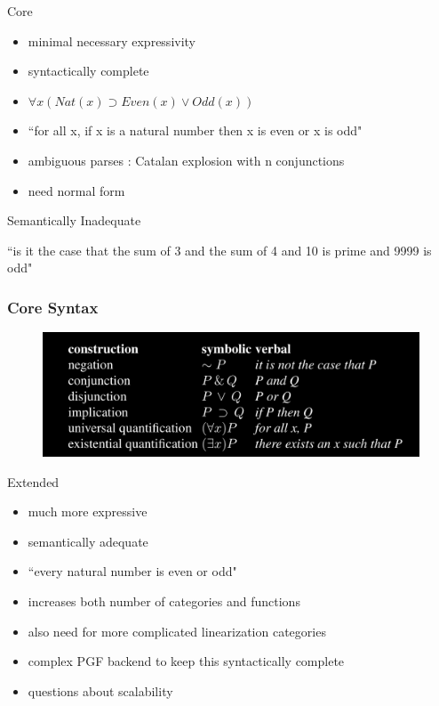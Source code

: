 \documentclass[10pt]{beamer}
\begin{document}
\begin{frame}

\begin{block}{Core}
\begin{itemize}
\item minimal necessary expressivity
\item syntactically complete
\item $\forall x (Nat(x) \supset Even(x) \lor Odd(x))$
\item ``for all x, if x is a natural number then x is even or x is odd"
\item ambiguous parses : Catalan explosion with n conjunctions
\item need normal form
\end{itemize}
\end{block}

\begin{exampleblock}{Semantically Inadequate}

``is it the case that the sum of 3 and the sum of 4 and 10 is prime and 9999 is odd"

\end{exampleblock}
\end{frame}

\begin{frame}
\frametitle{Core Syntax}

\begin{figure}
\hspace*{-3mm}%
   \includegraphics[width= \paperwidth]{core.png}
\end{figure}

\end{frame}

\begin{frame}

\begin{block}{Extended}
\begin{itemize}
\item much more expressive
\item semantically adequate
\item ``every natural number is even or odd"
\item increases both number of categories and functions
\item also need for more complicated linearization categories
\item complex PGF backend to keep this syntactically complete
\item questions about scalability
\end{itemize}

\end{block}

\end{frame}
\end{document}

